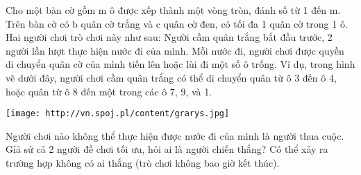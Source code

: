 Cho một bàn cờ gồm m ô được xếp thành một vòng tròn, đánh số từ 1 đến m. Trên bàn cờ có b quân cờ trắng và c quân cờ đen, có tối đa 1 quân cờ trong 1 ô. Hai người chơi trò chơi này như sau: Người cầm quân trắng bắt đầu trước, 2 người lần lượt thực hiện nước đi của mình. Mỗi nước đi, người chơi được quyền di chuyển quân cờ của mình tiến lên hoặc lùi đi một số ô trống. Ví dụ, trong hình vẽ dưới đây, người chơi cầm quân trắng có thể di chuyển quân từ ô 3 đến ô 4, hoặc quân từ ô 8 đến một trong các ô 7, 9, và 1.  


\texttt{[image: http://vn.spoj.pl/content/grarys.jpg]}

   Người chơi nào không thể thực hiện được nước đi của mình là người thua cuộc. Gỉả sử cả 2 người đề chơi tối ưu, hỏi ai là người chiến thắng? Có thể xảy ra trường hợp không có ai thắng (trò chơi không bao giờ kết thúc).  

\